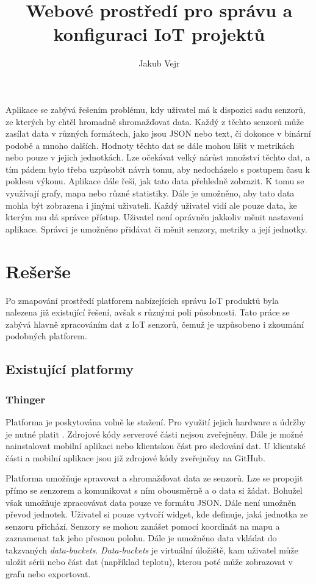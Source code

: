 \documentclass[thesis=M,czech]{FITthesis}[2018/10/20]
\title{Webové prostředí pro správu a konfiguraci IoT projektů}
\author{Jakub Vejr} %
\begin{document}

\begin{introduction}
	Aplikace se zabývá řešením problému, kdy uživatel má k dispozici sadu senzorů, ze kterých by chtěl hromadně shromažďovat data. Každý z těchto senzorů může zasílat data v různých formátech, jako jsou JSON nebo text, či dokonce v binární podobě a mnoho dalších. Hodnoty těchto dat se dále mohou lišit v metrikách nebo pouze v jejich jednotkách. Lze očekávat velký nárůst množství těchto dat, a tím pádem bylo třeba uzpůsobit návrh tomu, aby nedocházelo s postupem času k poklesu výkonu. Aplikace dále řeší, jak tato data přehledně zobrazit. K tomu se využívají grafy, mapa nebo různé statistiky. Dále je umožněno, aby tato data mohla být zobrazena i jinými uživateli. Každý uživatel vidí ale pouze data, ke kterým mu dá správce přístup. Uživatel není oprávněn jakkoliv měnit nastavení aplikace. Správci je umožněno přidávat či měnit senzory, metriky a její jednotky.
\end{introduction}
\chapter{Rešerše}
Po zmapování prostředí platforem nabízejících správu IoT produktů byla nalezena již existující řešení, avšak s různými poli působnosti.
Tato práce se zabývá hlavně zpracováním dat z IoT senzorů, čemuž je uzpůsobeno i zkoumání podobných platforem. 
\section{Existující platformy}
\subsection{Thinger}
Platforma je poskytována volně ke stažení. Pro využití jejich hardware a údržby je nutné platit \cite{thinger}. Zdrojové kódy serverové části nejsou zveřejněny. Dále je možné nainstalovat mobilní aplikaci nebo klientskou část pro sledování dat. U klientské části a mobilní aplikace jsou již zdrojové kódy zveřejněny na GitHub.

Platforma umožňuje spravovat a shromažďovat data ze senzorů. Lze se propojit přímo se senzorem a komunikovat s ním obousměrně a o data si žádat. Bohužel však umožňuje zpracovávat data pouze ve formátu JSON. Dále není umožněn převod jednotek. Uživatel si pouze vytvoří widget, kde definuje, jaká jednotka ze senzoru přichází. Senzory se mohou zanášet pomocí koordinát na mapu a zaznamenat tak jeho přesnou polohu. Dále je umožněno data vkládat do takzvaných \textit{data-buckets}. \textit{Data-buckets} je virtuální úložiště, kam uživatel může uložit sérii nebo část dat (například teplotu), kterou poté může zobrazovat v grafu nebo exportovat.
\end{document}
